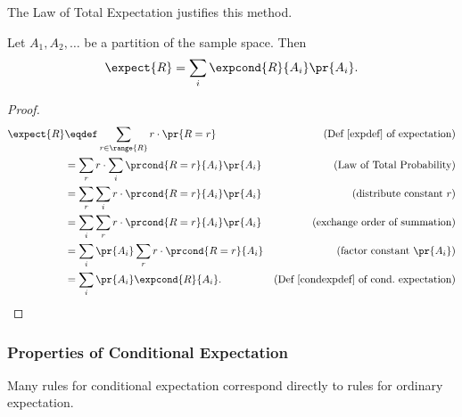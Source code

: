 The Law of Total Expectation justifies this method.
\begin{theorem} \label{thm:condexp}
Let $A_1,A_2,\dots$ be a partition of the sample space.  Then
\[
\expect{R} = \sum_i \expcond{R}{A_i} \pr{A_i}.
\]
\end{theorem}

\begin{proof}
  \begin{align*}
    \expect{R} &\eqdef \sum_{r \in \range{R}} r \cdot \pr{R=r}
                  & \text{(Def~\ref{expdef} of expectation)}\\
    &= \sum_r r \cdot \sum_i \prcond{R=r}{A_i} \pr{A_i}
            & \text{(Law of Total Probability)}\\
    &= \sum_r \sum_i r \cdot \prcond{R=r}{A_i} \pr{A_i}
              & \text{(distribute constant $r$)}\\
    &= \sum_i \sum_r r \cdot \prcond{R=r}{A_i} \pr{A_i}
              & \text{(exchange order of summation)}\\
    &= \sum_i \pr{A_i} \sum_r r \cdot \prcond{R=r}{A_i}
             & \text{(factor constant $\pr{A_i}$)}\\
    &= \sum_i \pr{A_i} \expcond{R}{A_i}.
             & \text{(Def~\ref{condexpdef} of cond.\ expectation)}
  \end{align*}
\end{proof}


\subsubsection{Properties of Conditional Expectation}

Many rules for conditional expectation correspond directly to rules for
ordinary expectation.

